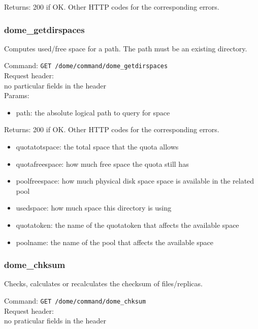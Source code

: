 \documentclass[a4paper,10pt]{scrreprt}
\begin{document}
Returns: 200 if OK. Other HTTP codes for the corresponding errors.\\

\subsubsection{dome\_getdirspaces}
Computes used/free space for a path. The path must be an existing directory.

Command:
\lstinline"GET /dome/command/dome_getdirspaces"\\

Request header:\\
no particular fields in the header\\

Params:\\
\begin{itemize}
 \item path: the absolute logical path to query for space
\end{itemize}

Returns: 200 if OK. Other HTTP codes for the corresponding errors.
\begin{itemize}
  \item quotatotspace: the total space that the quota allows
  \item quotafreespace: how much free space the quota still has
  \item poolfreespace: how much physical disk space space is available in the related pool
  \item usedspace: how much space this directory is using
  \item quotatoken: the name of the quotatoken that affects the available space
  \item poolname: the name of the pool that affects the available space
\end{itemize}



\subsubsection{dome\_chksum}
 Checks, calculates or recalculates the checksum of files/replicas.


Command:
\lstinline"GET /dome/command/dome_chksum"\\

Request header:\\
no praticular fields in the header\\
\end{document}
